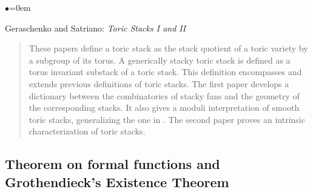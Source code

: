 \begin{list}{$\bullet$}{\leftmargin=0em}
\item Geraschenko and Satriano:  \emph{Toric Stacks I and II}
\cite{gs_toric1,gs_toric2}
\begin{quote}
These papers define a toric stack as the stack quotient of a toric
variety by a subgroup of its torus. A generically stacky toric stack
is defined as a torus invariant substack of a toric stack. This definition
encompasses and extends previous definitions of toric stacks. The first
paper develops a dictionary between the combinatorics of stacky fans
and the geometry of the corresponding stacks. It also gives a moduli
interpretation of smooth toric stacks, generalizing the one in \cite{perroni}.
The second paper proves an intrinsic characterization of toric stacks.
\end{quote}
\end{list}



\subsection{Theorem on formal functions and Grothendieck's Existence Theorem}
\label{subsection-theorem-formal-functions}


